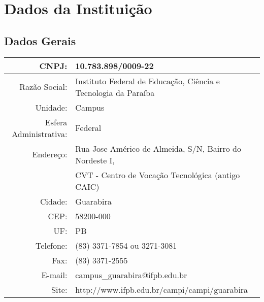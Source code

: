 \section{Dados da Institui\c{c}\~ao}
\subsection{Dados Gerais}

\begin{table}[!htpb]
\centering

\begin{small} 
  
\setlength{\tabcolsep}{3pt} 
\begin{tabular}{|r|l|}\hline

CNPJ: & 10.783.898/0009-22\\ \hline
Razão Social: & Instituto Federal de Educação, Ciência e Tecnologia da Paraíba \\ \hline
Unidade: & Campus \\ \hline
Esfera Administrativa: & Federal \\ \hline
Endereço: & Rua Jose Américo de Almeida, S/N, Bairro do Nordeste I,\\&CVT - Centro de Vocação Tecnológica (antigo CAIC)\\ \hline
Cidade:	& Guarabira     \\ \hline
CEP: & 58200-000 \\ \hline  
UF: & PB \\ \hline
Telefone: & (83) 3371-7854 ou 3271-3081	\\ \hline
Fax: & (83) 3371-2555\\ \hline
E-mail: & campus\_guarabira@ifpb.edu.br	\\ \hline
Site: & http://www.ifpb.edu.br/campi/campi/guarabira\\ \hline
\end{tabular} 
\end{small}
\label{dadosinstituicao}
\end{table} 
